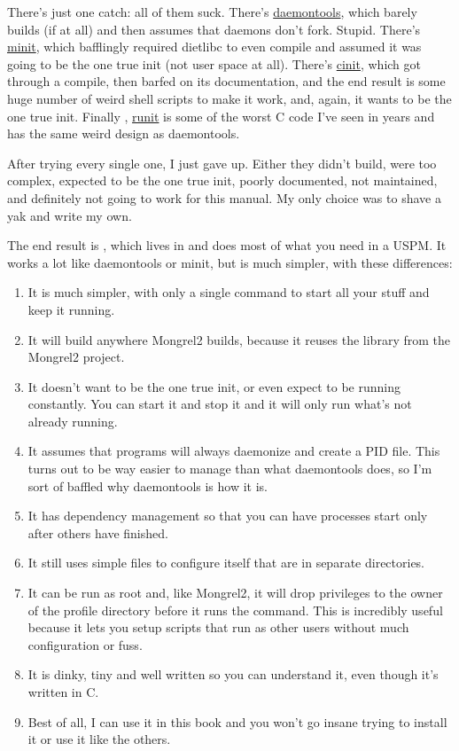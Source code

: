 There's just one catch: all of them suck.  There's \href{http://cr.yp.to/daemontools.html}{daemontools},
which barely builds (if at all) and then assumes that daemons don't fork.  Stupid.  There's
\href{http://www.fefe.de/minit/}{minit}, which bafflingly required dietlibc to even compile
and assumed it was going to be the one true init (not user space at all).  There's
\href{http://www.nico.schottelius.org/software/cinit/}{cinit}, which got through a compile,
then barfed on its documentation, and the end result is some huge number of weird
shell scripts to make it work, and, again, it wants to be the one true init.  Finally ,
\href{http://smarden.org/runit/}{runit} is some of the worst C code I've seen in years and
has the same weird design as daemontools.

After trying every single one, I just gave up.  Either they didn't build, were too complex,
expected to be the one true init, poorly documented, not maintained, and definitely not
going to work for this manual.  My only choice was to shave a yak and write my own.

The end result is , which lives in  and does
most of what you need in a USPM.  It works a lot like daemontools or minit, but
is much simpler, with these differences:

\begin{enumerate}
\item It is much simpler, with only a single command to start all your stuff and
    keep it running.
\item It will build anywhere Mongrel2 builds, because it reuses the 
    library from the Mongrel2 project.
\item It doesn't want to be the one true init, or even expect to be running constantly.
    You can start it and stop it and it will only run what's not already running.
\item It assumes that programs will always daemonize and create a PID file.  This turns
    out to be way easier to manage than what daemontools does, so I'm sort of baffled why
    daemontools is how it is.
\item It has dependency management so that you can have processes start only after others
    have finished.
\item It still uses simple files to configure itself that are in separate directories.
\item It can be run as root and, like Mongrel2, it will drop privileges to the owner
    of the profile directory before it runs the command.  This is incredibly useful because
    it lets you setup scripts that run as other users without much configuration or fuss.
\item It is dinky, tiny and well written so you can understand it, even though it's written
    in C.
\item Best of all, I can use it in this book and you won't go insane trying to install it
    or use it like the others.
\end{enumerate}

